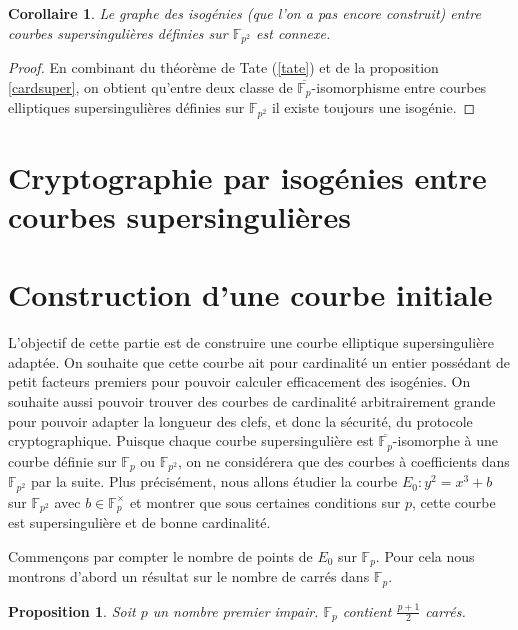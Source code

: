\documentclass{article}
\theoremstyle{plain}%
\newtheorem{prop}[thm]{Proposition}
\newtheorem{cor}[thm]{Corollaire}
\theoremstyle{definition}%
\newcommand{\F}{\mathbb{F}}
\begin{document}
\begin{cor}
  Le graphe des isogénies (que l'on a pas encore construit) entre courbes supersingulières définies sur $\F_{p^2}$ est connexe.
\end{cor}

\begin{proof}
  En combinant du théorème de Tate (\ref{tate}) et de la proposition \ref{cardsuper}, on obtient qu'entre deux classe de $\overline{\F_p}$-isomorphisme entre courbes elliptiques supersingulières définies sur $\F_{p^2}$ il existe toujours une isogénie.
\end{proof}

\section{Cryptographie par isogénies entre courbes supersingulières}

\section{Construction d'une courbe initiale}

L'objectif de cette partie est de construire une courbe elliptique supersingulière adaptée. 
On souhaite que cette courbe ait pour cardinalité un entier possédant de petit facteurs premiers pour pouvoir calculer efficacement des isogénies. 
On souhaite aussi pouvoir trouver des courbes de cardinalité arbitrairement grande pour pouvoir adapter la longueur des clefs, et donc la sécurité, du protocole cryptographique.
Puisque chaque courbe supersingulière est $\overline{\F_p}$-isomorphe à une courbe définie sur $\F_{p}$ ou $\F_{p^2}$, on ne considérera que des courbes à coefficients dans $\F_{p^2}$ par la suite.
Plus précisément, nous allons étudier la courbe $E_0 : y^2 = x^3 + b$ sur $\F_{p^2}$ avec $b\in\F_{p}^\times$ et montrer que sous certaines conditions sur $p$, cette courbe est supersingulière et de bonne cardinalité.


Commençons par compter le nombre de points de $E_0$ sur $\F_{p}$. Pour cela nous montrons d'abord un résultat sur le nombre de carrés dans $\F_{p}$.

\begin{prop}
  Soit $p$ un nombre premier impair. $\F_{p}$ contient $\frac{p+1}{2}$ carrés.
\end{prop}
\end{document}
